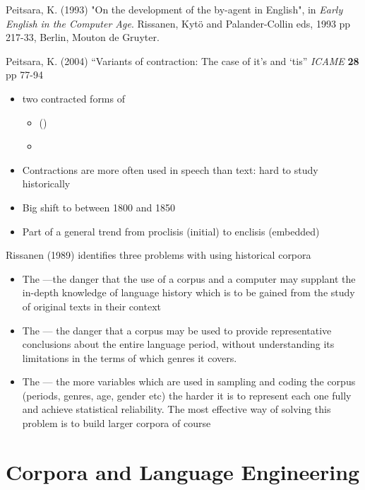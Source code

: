 \documentclass[a4paper,landscape,headrule,footrule,dvips]{foils}
\begin{document}
\begin{CJK}{UTF8}{min}
Peitsara, K. (1993) "On the development of the by-agent in English", in \textit{Early English in the Computer Age}. Rissanen, Kytö and Palander-Collin eds, 1993 pp 217-33, Berlin, Mouton de Gruyter. 

Peitsara, K. (2004) ``Variants of contraction: The case of it’s and ‘tis'' \textit{ICAME} \textbf{28} pp 77-94

\begin{itemize}
\item two contracted forms of 
  \begin{itemize}
  \item {} ()
  \item {} 
  \end{itemize}
\item Contractions are more often used in speech than text: hard to study historically
\item Big shift to  between 1800 and 1850
\item Part of a general trend from proclisis (initial) to enclisis (embedded)
\end{itemize}

\MyLogo{}
Rissanen (1989) identifies three problems  with using historical corpora
\begin{itemize}
\item The  ---the danger that the use of a corpus and a computer may supplant the in-depth knowledge of language history which is to be gained from the study of original texts in their context
\item  The  --- the danger that a corpus may be used to provide representative conclusions about the entire language period, without understanding its limitations in the terms of which genres it covers.
\item The  --- the more variables which are used in sampling and coding the corpus (periods, genres, age, gender etc) the harder it is to represent each one fully and achieve statistical reliability. The most effective way of solving this problem is to build larger corpora of course
\end{itemize}



\section{Corpora and Language Engineering}



\end{CJK}
\end{document}
